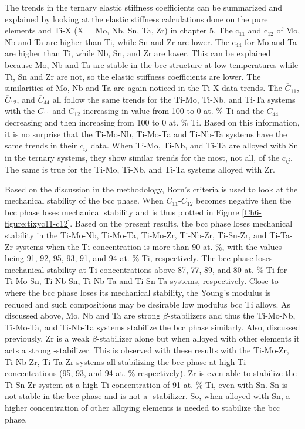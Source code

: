 The trends in the ternary elastic stiffness coefficients can be summarized and explained by looking at the elastic stiffness calculations done on the pure elements and Ti-X (X = Mo, Nb, Sn, Ta, Zr) in chapter 5. The c$_{11}$ and c$_{12}$ of Mo, Nb and Ta are higher than Ti, while Sn and Zr are lower. The c$_{44}$ for Mo and Ta are higher than Ti, while Nb, Sn, and Zr are lower. This can be explained because Mo, Nb and Ta are stable in the bcc structure at low temperatures while Ti, Sn and Zr are not, so the elastic stiffness coefficients are lower. The similarities of Mo, Nb and Ta are again noticed in the Ti-X data trends. The $\overline{C}_{11}$, $\overline{C}_{12}$, and $\overline{C}_{44}$ all follow the same trends for the Ti-Mo, Ti-Nb, and Ti-Ta systems with the $\overline{C}_{11}$ and $\overline{C}_{12}$ increasing in value from 100 to 0 at. \% Ti and the $\overline{C}_{44}$ decreasing and then increasing from 100 to 0 at. \% Ti. Based on this information, it is no surprise that the Ti-Mo-Nb, Ti-Mo-Ta and Ti-Nb-Ta systems have the same trends in their $c_{ij}$ data. When Ti-Mo, Ti-Nb, and Ti-Ta are alloyed with Sn in the ternary systems, they show similar trends for the most, not all, of the $c_{ij}$. The same is true for the Ti-Mo, Ti-Nb, and Ti-Ta systems alloyed with Zr.

Based on the discussion in the methodology, Born's criteria is used to look at the mechanical stability of the bcc phase. When $\overline{C}_{11}$-$\overline{C}_{12}$ becomes negative then the bcc phase loses mechanical stability and is thus plotted in Figure \ref{Ch6-figure:tixyc11-c12}. Based on the present results, the bcc phase loses mechanical stability in the Ti-Mo-Nb, Ti-Mo-Ta, Ti-Mo-Zr, Ti-Nb-Zr, Ti-Sn-Zr, and Ti-Ta-Zr systems when the Ti concentration is more than 90 at. \%, with the values being 91, 92, 95, 93, 91, and 94 at. \% Ti, respectively. The bcc phase loses mechanical stability at Ti concentrations above 87, 77, 89, and 80 at. \% Ti for Ti-Mo-Sn, Ti-Nb-Sn, Ti-Nb-Ta and Ti-Sn-Ta systems, respectively. Close to where the bcc phase loses its mechanical stability, the Young's modulus is reduced and such compositions may be desirable low modulus bcc Ti alloys. As discussed above, Mo, Nb and Ta are strong $\beta$-stabilizers and thus the Ti-Mo-Nb, Ti-Mo-Ta, and Ti-Nb-Ta systems stabilize the bcc phase similarly. Also, discussed previously, Zr is a weak $\beta$-stabilizer alone but when alloyed with other elements it acts a strong -stabilizer. This is observed with these results with the Ti-Mo-Zr, Ti-Nb-Zr, Ti-Ta-Zr systems all stabilizing the bcc phase at high Ti concentrations (95, 93, and 94 at. \% respectively). Zr is even able to stabilize the Ti-Sn-Zr system at a high Ti concentration of 91 at. \% Ti, even with Sn. Sn is not stable in the bcc phase and is not a -stabilizer. So, when alloyed with Sn, a higher concentration of other alloying elements is needed to stabilize the bcc phase. 

